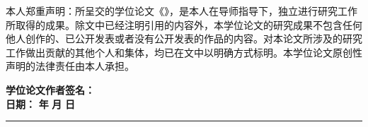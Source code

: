 \clearpage
\makeatletter

\begin{center}
  \heiti{}
\end{center}
{\songti
\vskip3pt\sihao[1.4]\par
本人郑重声明：所呈交的学位论文《\tongji@cheadingtitlenew》，是本人在导师指导下，独立进行研究工作所取得的成果。除文中已经注明引用的内容外，本学位论文的研究成果不包含任何他人创作的、已公开发表或者没有公开发表的作品的内容。对本论文所涉及的研究工作做出贡献的其他个人和集体，均已在文中以明确方式标明。本学位论文原创性声明的法律责任由本人承担。 \par
\vskip10pt
\begingroup
  \parindent0pt
  \hspace*{4.4cm} {\songti\bfseries 学位论文作者签名：} \relax\hspace*{1cm}\\[3pt]
  \hspace*{7.4cm} {\songti\bfseries 日期：} \hspace{1.0cm} {\songti\bfseries 年} \hspace{1.0cm} {\songti\bfseries 月} \hspace{1.0cm} {\songti\bfseries 日} \relax\hspace*{0.1cm}
\endgroup
}

\vspace*{0.6cm}
\hrule

\makeatletter

